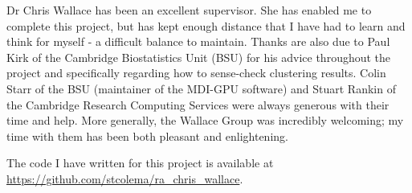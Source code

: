 \documentclass[14pt]{extarticle} %
\begin{document}
	Dr Chris Wallace has been an excellent supervisor. She has enabled me to complete this project, but has kept enough distance that I have had to learn and think for myself - a difficult balance to maintain. Thanks are also due to Paul Kirk of the Cambridge Biostatistics Unit (BSU) for his advice throughout the project and specifically regarding how to sense-check clustering results. Colin Starr of the BSU (maintainer of the MDI-GPU software) and Stuart Rankin of the Cambridge Research Computing Services were always generous with their time and help. More generally, the Wallace Group was incredibly welcoming; my time with them has been both pleasant and enlightening. 
	
	The code I have written for this project is available at \url{https://github.com/stcolema/ra_chris_wallace}.
	
	\newpage
	
	\tableofcontents
	
	\newpage
	
\end{document}
